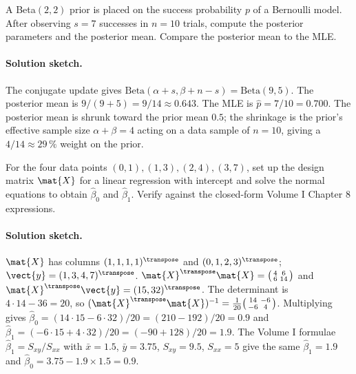 \begin{exercise}
A Beta$(2, 2)$ prior is placed on the success probability $p$ of a
Bernoulli model. After observing $s = 7$ successes in $n = 10$
trials, compute the posterior parameters and the posterior mean.
Compare the posterior mean to the MLE.

\paragraph{Solution sketch.} The conjugate update gives
$\mathrm{Beta}(\alpha + s, \beta + n - s) = \mathrm{Beta}(9, 5)$.
The posterior mean is $9/(9+5) = 9/14 \approx 0.643$. The MLE is
$\hat{p} = 7/10 = 0.700$. The posterior mean is shrunk toward the
prior mean $0.5$; the shrinkage is the prior's effective sample
size $\alpha + \beta = 4$ acting on a data sample of $n = 10$,
giving a $4/14 \approx 29\,\%$ weight on the prior.
\end{exercise}

\begin{exercise}
For the four data points $(0,1), (1,3), (2,4), (3,7)$, set up the
design matrix $\mat{X}$ for a linear regression with intercept and
solve the normal equations to obtain $\hat{\beta}_{0}$ and
$\hat{\beta}_{1}$. Verify against the closed-form Volume I Chapter
8 expressions.

\paragraph{Solution sketch.} $\mat{X}$ has columns
$(1,1,1,1)^{\transpose}$ and $(0,1,2,3)^{\transpose}$;
$\vect{y} = (1, 3, 4, 7)^{\transpose}$.
$\mat{X}^{\transpose}\mat{X} = \bigl(\begin{smallmatrix} 4 & 6 \\ 6 & 14 \end{smallmatrix}\bigr)$
and $\mat{X}^{\transpose}\vect{y} = (15, 32)^{\transpose}$. The
determinant is $4 \cdot 14 - 36 = 20$, so
$(\mat{X}^{\transpose}\mat{X})^{-1} = \frac{1}{20}\bigl(\begin{smallmatrix} 14 & -6 \\ -6 & 4 \end{smallmatrix}\bigr)$.
Multiplying gives $\hat{\beta}_{0} = (14 \cdot 15 - 6 \cdot
32)/20 = (210 - 192)/20 = 0.9$ and $\hat{\beta}_{1} = (-6 \cdot
15 + 4 \cdot 32)/20 = (-90 + 128)/20 = 1.9$. The Volume I formulae
$\hat{\beta}_{1} = S_{xy}/S_{xx}$ with $\bar{x} = 1.5$,
$\bar{y} = 3.75$, $S_{xy} = 9.5$, $S_{xx} = 5$ give the same
$\hat{\beta}_{1} = 1.9$ and $\hat{\beta}_{0} = 3.75 - 1.9 \times
1.5 = 0.9$.
\end{exercise}

